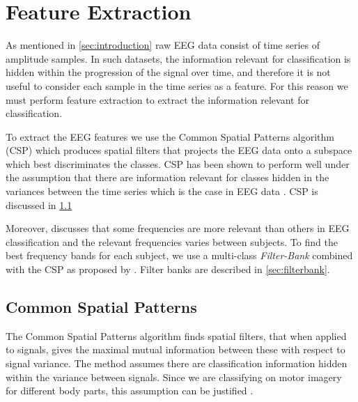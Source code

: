 \section{Feature Extraction}\label{sec:feature-extraction}
As mentioned in \cref{sec:introduction} raw EEG data consist of time series of amplitude samples. In such datasets, the information relevant for classification is hidden within the progression of the signal over time, and therefore it is not useful to consider each sample in the time series as a feature. For this reason we must perform feature extraction to extract the information relevant for classification. 

To extract the EEG features we use the Common Spatial Patterns algorithm (CSP) which produces spatial filters that projects the EEG data onto a subspace which best discriminates the classes.
CSP has been shown to perform well under the assumption that there are information relevant for classes hidden in the variances between the time series which is the case in EEG data \cite{ang2012filter}. CSP is discussed in \cref{sec:csp}

Moreover, \cite{ang2012filter} discusses that some frequencies are more relevant  than others in EEG classification and the relevant frequencies varies between subjects. To find the best frequency bands for each subject, we use a multi-class \emph{Filter-Bank} combined with the CSP as proposed by \citet{ang2012filter}. Filter banks are described in \cref{sec:filterbank}.


\subsection{Common Spatial Patterns}\label{sec:csp}
The Common Spatial Patterns algorithm finds spatial filters, that when applied to signals, gives the maximal mutual information between these with respect to signal variance. The method assumes there are classification information hidden within the variance between signals. Since we are classifying on motor imagery for different body parts, this assumption can be justified \citep{blankertz2008optimizing}.

